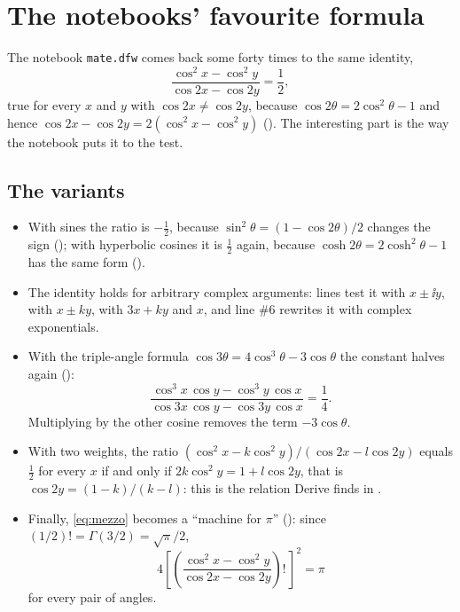 \section{The notebooks' favourite formula}
\label{sec:mezzo}

The notebook \texttt{mate.dfw} comes back some forty times to the same
identity,
\begin{equation}\label{eq:mezzo}
  \frac{\cos^2x-\cos^2y}{\cos2x-\cos2y}=\frac12 ,
\end{equation}
true for every $x$ and $y$ with $\cos2x\neq\cos2y$, because
$\cos2\theta=2\cos^2\theta-1$ and hence $\cos2x-\cos2y=2(\cos^2x-\cos^2y)$
(). The interesting part is the way the notebook puts it to
the test.

\subsection{The variants}

\begin{itemize}[leftmargin=1.4em,itemsep=2pt]
  \item With sines the ratio is $-\tfrac12$, because
        $\sin^2\theta=(1-\cos2\theta)/2$ changes the sign ();
        with hyperbolic cosines it is $\tfrac12$ again, because
        $\cosh2\theta=2\cosh^2\theta-1$ has the same form ().
  \item The identity holds for arbitrary complex arguments: lines
         test it with $x\pm\ii y$, with $x\pm ky$, with
        $3x+ky$ and $x$, and line \#6 rewrites it with complex exponentials.
  \item With the triple-angle formula $\cos3\theta=4\cos^3\theta-3\cos\theta$
        the constant halves again ():
        \begin{equation}\label{eq:quarto}
          \frac{\cos^3x\,\cos y-\cos^3y\,\cos x}{\cos3x\,\cos y-\cos3y\,\cos x}=\frac14 .
        \end{equation}
        Multiplying by the other cosine removes the term $-3\cos\theta$.
  \item With two weights, the ratio
        $(\cos^2x-k\cos^2y)/(\cos2x-l\cos2y)$ equals $\tfrac12$ for every $x$ if
        and only if $2k\cos^2y=1+l\cos2y$, that is $\cos2y=(1-k)/(k-l)$: this is
        the relation Derive finds in .
  \item Finally, \eqref{eq:mezzo} becomes a ``machine for $\pi$''
        (): since $(1/2)!=\Gamma(3/2)=\sqrt\pi/2$,
        \[
          4\left[\left(\frac{\cos^2x-\cos^2y}{\cos2x-\cos2y}\right)!\,\right]^2=\pi
        \]
        for every pair of angles.
\end{itemize}

